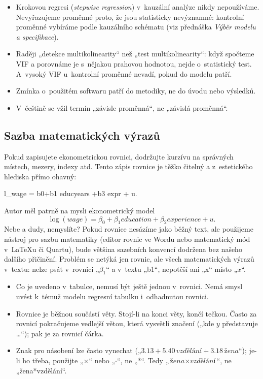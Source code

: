\documentclass[11pt,a4paper]{article}
\begin{document}
\begin{itemize}[itemsep=2pt, topsep=2pt]
  \item Krokovou regresi (\textit{stepwise regression}) v~kauzální analýze nikdy nepoužíváme. Nevyřazujeme proměnné proto, že jsou statisticky nevýznamné: kontrolní proměnné vybíráme podle kauzálního schématu (viz přednáška \textit{Výběr modelu a specifikace}).
  \item Raději „detekce multikolinearity“ než „test multikolinearity“: když spočteme VIF a porovnáme je s~nějakou prahovou hodnotou, nejde o~statistický test. A~vysoký VIF u~kontrolní proměnné nevadí, pokud do modelu patří.
  \item Zmínka o~použitém softwaru patří do metodiky, ne do úvodu nebo výsledků.
  \item V~češtině se vžil termín „závisle proměnná“, ne „závislá proměnná“.
\end{itemize}

\subsection*{Sazba matematických výrazů}

Pokud zapisujete ekonometrickou rovnici, dodržujte kurzívu na správných místech, mezery, indexy atd. Tento zápis rovnice je těžko čitelný a z~estetického hlediska přímo ohavný:
\begin{center}
l\_wage = b0+b1 educyears +b3 expr + u.
\end{center}
Autor měl patrně na mysli ekonometrický model
\[
  \log(\textit{wage}) = \beta_0 + \beta_1\textit{education} + \beta_2\textit{experience} + u.
\]
Nebe a dudy, nemyslíte? Pokud rovnice nesázíme jako běžný text, ale použijeme nástroj pro sazbu matematiky (editor rovnic ve Wordu nebo matematický mód v~\LaTeX u či Quartu), bude většina sazebních konvencí dodržena bez našeho dalšího přičinění. Problém se netýká jen rovnic, ale všech matematických výrazů v~textu: nelze psát v~rovnici „$\beta_1$“ a v~textu „b1“, nepotěší ani „x“ místo „$x$“.
\begin{itemize}[itemsep=2pt, topsep=2pt]
  \item Co je uvedeno v~tabulce, nemusí být ještě jednou v~rovnici. Nemá smysl uvést k~témuž modelu regresní tabulku i~odhadnutou rovnici.
  \item Rovnice je běžnou součástí věty. Stojí-li na konci věty, končí tečkou. Často za rovnicí pokračujeme vedlejší větou, která vysvětlí značení („kde $y$ představuje \ldots“); pak je za rovnicí čárka.
  \item Znak pro násobení lze často vynechat („$3.13 + 5.40\,\textit{vzdělání} + 3.18\,\textit{žena}$“); je-li ho třeba, použijte „$\times$“ nebo „$\cdot$“, ne „*“. Tedy „$\textit{žena} \times \textit{vzdělání}$“, ne „žena*vzdělání“.
\end{itemize}
\end{document}
